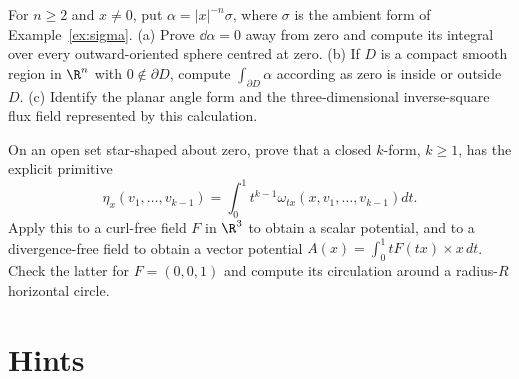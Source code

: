 \begin{exercise}[$\star\star$]\label{ex:v9-ch03-source-flux}
For $n\ge2$ and $x\ne0$, put $\alpha=|x|^{-n}\sigma$, where $\sigma$ is the ambient form of Example~\ref{ex:sigma}.
(a) Prove $\dd\alpha=0$ away from zero and compute its integral over every outward-oriented sphere centred at zero.
(b) If $D$ is a compact smooth region in $\R^n$ with $0\notin\partial D$, compute $\int_{\partial D}\alpha$ according as zero is inside or outside $D$.
(c) Identify the planar angle form and the three-dimensional inverse-square flux field represented by this calculation.
\end{exercise}

\begin{exercise}[$\star\star$]\label{ex:v9-ch03-radial-potentials}
On an open set star-shaped about zero, prove that a closed $k$-form, $k\ge1$, has the explicit primitive
\[
\eta_x(v_1,\ldots,v_{k-1})=
\int_0^1 t^{k-1}\omega_{tx}(x,v_1,\ldots,v_{k-1})dt.
\]
Apply this to a curl-free field $F$ in $\R^3$ to obtain a scalar potential, and to a divergence-free field to obtain a vector potential
$A(x)=\int_0^1tF(tx)\times x\,dt$. Check the latter for $F=(0,0,1)$ and compute its circulation around a radius-$R$ horizontal circle.
\end{exercise}

\section{Hints}

